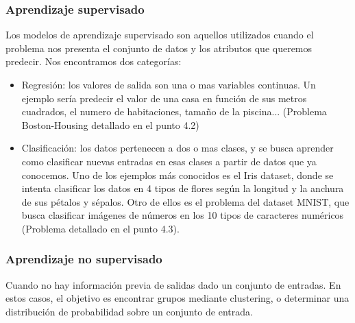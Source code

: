 \subsubsection {Aprendizaje supervisado}
Los modelos de aprendizaje supervisado son aquellos utilizados cuando el problema nos presenta el conjunto de datos y los atributos que queremos predecir. Nos encontramos dos categorías:
\begin{itemize}
\item Regresión: los valores de salida son una o mas variables continuas. Un ejemplo sería predecir el valor de una casa en función de sus metros cuadrados, el numero de habitaciones, tamaño de la piscina... (Problema Boston-Housing detallado en el punto 4.2)
\item Clasificación: los datos pertenecen a dos o mas clases, y se busca aprender como clasificar nuevas entradas en esas clases a partir de datos que ya conocemos. Uno de los ejemplos más conocidos es el Iris dataset, donde se intenta clasificar los datos en 4 tipos de flores según la longitud y la anchura de sus pétalos y sépalos. Otro de ellos es el problema del dataset MNIST, que busca clasificar imágenes de números en los 10 tipos de caracteres numéricos (Problema detallado en el punto 4.3).
\end{itemize}
\subsubsection {Aprendizaje no supervisado}
Cuando no hay información previa de salidas dado un conjunto de entradas. En estos casos, el objetivo es encontrar grupos mediante clustering, o determinar una distribución de probabilidad sobre un conjunto de entrada.


